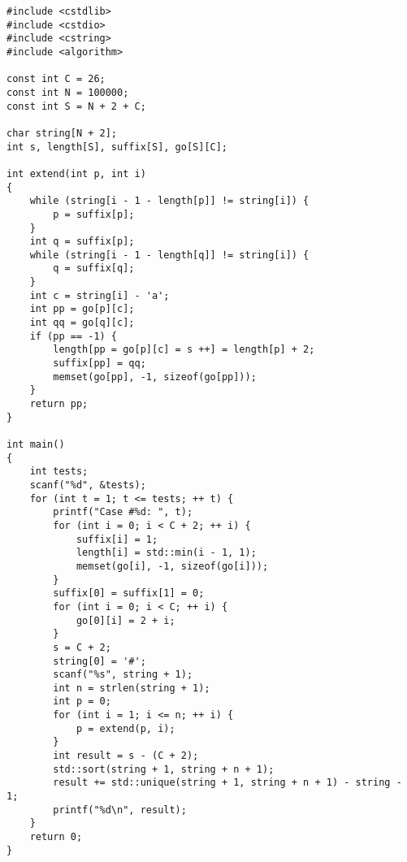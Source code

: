 \begin{lstlisting}
#include <cstdlib>
#include <cstdio>
#include <cstring>
#include <algorithm>

const int C = 26;
const int N = 100000;
const int S = N + 2 + C;

char string[N + 2];
int s, length[S], suffix[S], go[S][C];

int extend(int p, int i)
{
    while (string[i - 1 - length[p]] != string[i]) {
        p = suffix[p];
    }
    int q = suffix[p];
    while (string[i - 1 - length[q]] != string[i]) {
        q = suffix[q];
    }
    int c = string[i] - 'a';
    int pp = go[p][c];
    int qq = go[q][c];
    if (pp == -1) {
        length[pp = go[p][c] = s ++] = length[p] + 2;
        suffix[pp] = qq;
        memset(go[pp], -1, sizeof(go[pp]));
    }
    return pp;
}

int main()
{
    int tests;
    scanf("%d", &tests);
    for (int t = 1; t <= tests; ++ t) {
        printf("Case #%d: ", t);
        for (int i = 0; i < C + 2; ++ i) {
            suffix[i] = 1;
            length[i] = std::min(i - 1, 1);
            memset(go[i], -1, sizeof(go[i]));
        }
        suffix[0] = suffix[1] = 0;
        for (int i = 0; i < C; ++ i) {
            go[0][i] = 2 + i;
        }
        s = C + 2;
        string[0] = '#';
        scanf("%s", string + 1);
        int n = strlen(string + 1);
        int p = 0;
        for (int i = 1; i <= n; ++ i) {
            p = extend(p, i);
        }
        int result = s - (C + 2);
        std::sort(string + 1, string + n + 1);
        result += std::unique(string + 1, string + n + 1) - string - 1;
        printf("%d\n", result);
    }
    return 0;
}

\end{lstlisting}